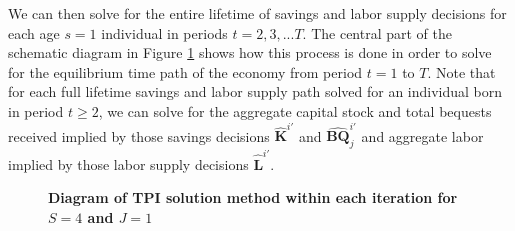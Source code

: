 \documentclass[letterpaper,12pt]{article}
\theoremstyle{definition}
\begin{document}
  We can then solve for the entire lifetime of savings and labor supply decisions for each age $s=1$ individual in periods $t=2,3,...T$. The central part of the schematic diagram in Figure \ref{FigTPIdiag} shows how this process is done in order to solve for the equilibrium time path of the economy from period $t=1$ to $T$. Note that for each full lifetime savings and labor supply path solved for an individual born in period $t\geq 2$, we can solve for the aggregate capital stock and total bequests received implied by those savings decisions $\bm{\hat{K}}^{i'}$ and $\bm{\hat{BQ}}_{j}^{i'}$ and aggregate labor implied by those labor supply decisions $\bm{\hat{L}}^{i'}$.

  \begin{figure}[p]\centering \captionsetup{width=4.0in}
    \caption{\label{FigTPIdiag}\textbf{Diagram of TPI solution method within each iteration for $S=4$ and $J=1$}}
  \end{figure}
\end{document}
